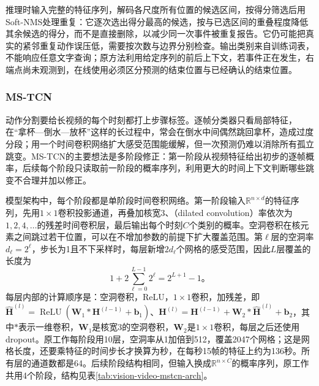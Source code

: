 推理时输入完整的特征序列，解码各尺度所有位置的候选区间，按得分筛选后用Soft-NMS处理重复：它逐次选出得分最高的候选，按与已选区间的重叠程度降低其余候选的得分，而不是直接删除，以减少同一次事件被重复报告。它仍可能把真实的紧邻重复动作误压低，需要按次数与边界分别检查。输出类别来自训练词表，不能响应任意文字查询；原方法利用给定序列的前后上下文，若事件正在发生，右端点尚未观测到，在线使用必须区分预测的结束位置与已经确认的结束位置。

\subsubsection{MS-TCN}
\label{sec:vision-video-mstcn}

动作分割要给长视频的每个时刻都打上步骤标签。逐帧分类器只看局部特征，在“拿杯—倒水—放杯”这样的长过程中，常会在倒水中间偶然跳回拿杯，造成过度分段；用一个时间卷积网络扩大感受范围能缓解，但一次预测仍难以消除所有孤立跳变。MS-TCN的主要想法是多阶段修正：第一阶段从视频特征给出初步的逐帧概率，后续每个阶段只读取前一阶段的概率序列，利用更大的时间上下文判断哪些跳变不合理并加以修正。

模型架构中，每个阶段都是单阶段时间卷积网络。第一阶段输入$\mathbb{R}^{n\times d}$的特征序列，先用$1\times1$卷积投影通道，再叠加核宽3、（dilated convolution）率依次为$1,2,4,\ldots$的残差时间卷积层，最后输出每个时刻$C$个类别的概率。空洞卷积在核元素之间跳过若干位置，可以在不增加参数的前提下扩大覆盖范围。第$\ell$层的空洞率$d_\ell=2^\ell$，步长为1且不下采样时，每层新增$2d_\ell$个网格的感受范围，因此$L$层覆盖的长度为
\[
  1+2\sum_{\ell=0}^{L-1}2^\ell=2^{L+1}-1\text{。}
\]
每层内部的计算顺序是：空洞卷积，ReLU，$1\times1$卷积，加残差，即$\widehat{\bm{H}}^{(l)}=\operatorname{ReLU}(\bm{W}_1*\bm{H}^{(l-1)}+\bm{b}_1)$、$\bm{H}^{(l)}=\bm{H}^{(l-1)}+\bm{W}_2*\widehat{\bm{H}}^{(l)}+\bm{b}_2$，其中$*$表示一维卷积，$\bm{W}_1$是核宽3的空洞卷积，$\bm{W}_2$是$1\times1$卷积，每层之后还使用dropout。原工作每阶段用10层，空洞率从1加倍到512，覆盖2047个网格；这是网格长度，还要乘特征的时间步长才换算为秒，在每秒15帧的特征上约为136秒。所有层的通道数都是64。后续阶段结构相同，但输入换成$\mathbb{R}^{n\times C}$的概率序列，原工作共用4个阶段，结构见表\ref{tab:vision-video-mstcn-arch}。

